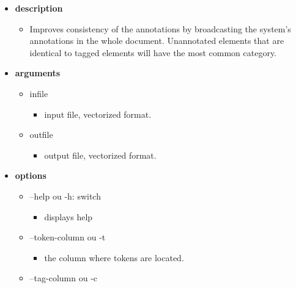 \documentclass[manual-fr.tex]{subfiles}
\begin{document}
\begin{itemize}
    \item[] \textbf{description}
        \begin{itemize}
            \item[] Improves consistency of the annotations by broadcasting the system's annotations in the whole document. Unannotated elements that are identical to tagged elements will have the most common category.
        \end{itemize}
    \item[] \textbf{arguments}
        \begin{itemize}
            \item[] infile
                \begin{itemize}
                    \item[] input file, vectorized format.
                \end{itemize}
        \end{itemize}
        \begin{itemize}
            \item[] outfile
                \begin{itemize}
                    \item[] output file, vectorized format.
                \end{itemize}
        \end{itemize}
    \item[] \textbf{options}
        \begin{itemize}
            \item[] --help ou -h: switch
                \begin{itemize}
                    \item[] displays help
                \end{itemize}
            \item[] --token-column ou -t
                \begin{itemize}
                    \item[] the column where tokens are located.
                \end{itemize}
            \item[] --tag-column ou -c
                \begin{itemize}

\end{itemize}
\end{itemize}
\end{itemize}
\end{document}
